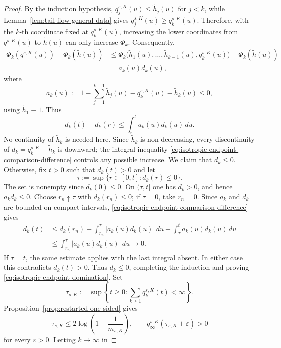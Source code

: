 \documentclass[10pt,a4paper]{amsart}
\begin{document}
\begin{proof}
By the induction hypothesis,
\(q^{s,K}_j(u)\leq\widetilde h_j(u)\) for \(j<k\), while
Lemma~\ref{lem:tail-flow-general-data} gives
\(q^{s,K}_j(u)\geq q^{s,K}_k(u)\). Therefore, with the \(k\)-th
coordinate fixed at \(q^{s,K}_k(u)\), increasing the lower coordinates
from \(q^{s,K}(u)\) to \(\widetilde h(u)\) can only increase
\(\Phi_k\). Consequently,
\[
\begin{aligned}
        \Phi_k(q^{s,K}(u))-\Phi_k(\widetilde h(u))
        &\leq
        \Phi_k\bigl(
        \widetilde h_1(u),\ldots,\widetilde h_{k-1}(u),
        q^{s,K}_k(u)
        \bigr)
        -\Phi_k(\widetilde h(u))  \\
        &=
        a_k(u)d_k(u),
\end{aligned}
\]
where
\[
        a_k(u)
        :=
        1-\sum_{j=1}^{k-1}\widetilde h_j(u)
        -q^{s,K}_k(u)-\widetilde h_k(u)
        \leq0,
\]
using $\tilde h_1 \equiv 1$. 
Thus
\begin{equation}
\label{eq:isotropic-endpoint-comparison-difference}
d_k(t)-d_k(r)
\leq
\int_r^t a_k(u)d_k(u)\,du.
\end{equation}
No continuity of $\widetilde h_k$ is needed here. Since
$\widetilde h_k$ is non-decreasing, every discontinuity of
$d_k=q_k^{s,K}-\widetilde h_k$ is downward; the integral inequality
\eqref{eq:isotropic-endpoint-comparison-difference} controls any possible
increase.
We claim that $d_k\leq0$. Otherwise, fix $t>0$ such that $d_k(t)>0$ and
let
\[
\tau:=\sup\{r\in[0,t]:d_k(r)\leq0\}.
\]
The set is nonempty since $d_k(0)\leq0$. On $(\tau,t]$ one has
$d_k>0$, and hence $a_kd_k\leq0$. Choose $r_n\uparrow\tau$ with
$d_k(r_n)\leq0$; if $\tau=0$, take $r_n=0$. Since $a_k$ and $d_k$ are
bounded on compact intervals, \eqref{eq:isotropic-endpoint-comparison-difference}
gives
\[
\begin{aligned}
d_k(t)
&\leq
d_k(r_n)
+\int_{r_n}^{\tau}|a_k(u)d_k(u)|\,du
+\int_{\tau}^{t}a_k(u)d_k(u)\,du \\
&\leq
\int_{r_n}^{\tau}|a_k(u)d_k(u)|\,du
\longrightarrow0.
\end{aligned}
\]
If $\tau=t$, the same estimate applies with the last integral absent.
In either case this contradicts $d_k(t)>0$. Thus $d_k\leq0$, completing
the induction and proving \eqref{eq:isotropic-endpoint-domination}.
Set
\[
\tau_{s,K}
:=
\sup\left\{t\geq0:
\sum_{k\geq1}q_k^{s,K}(t)<\infty\right\}.
\]
Proposition~\ref{prop:restarted-one-sided} gives
\[
\tau_{s,K}
\leq
2\log\left(1+\frac1{m_{s,K}}\right),
\qquad
q_\infty^{s,K}(\tau_{s,K}+\varepsilon)>0
\]
for every $\varepsilon>0$. Letting $k\to\infty$ in

\end{proof}
\end{document}
